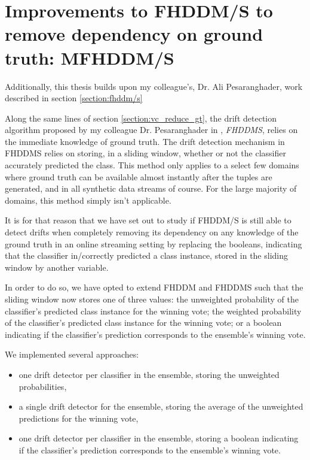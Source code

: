 \section{Improvements to FHDDM/S to remove dependency on ground truth: MFHDDM/S}

Additionally, this thesis builds upon my colleague's, Dr. Ali Pesaranghader, work described in section \ref{section:fhddm/s}

Along the same lines of section \ref{section:vc_reduce_gt}, the drift detection algorithm proposed by my colleague Dr. Pesaranghader in \cite{pesaranghader2016fast}, \textit{FHDDMS}, relies on the immediate knowledge of ground truth. The drift detection mechanism in FHDDMS relies on storing, in a sliding window, whether or not the classifier accurately predicted the class. This method only applies to a select few domains where ground truth can be available almost instantly after the tuples are generated, and in all synthetic data streams of course. For the large majority of domains, this method simply isn't applicable.

It is for that reason that we have set out to study if FHDDM/S is still able to detect drifts when completely removing its dependency on any knowledge of the ground truth in an online streaming setting by replacing the booleans, indicating that the classifier in/correctly predicted a class instance, stored in the sliding window by another variable.

In order to do so, we have opted to extend FHDDM and FHDDMS such that the sliding window now stores one of three values: the unweighted probability of the classifier's predicted class instance for the winning vote; the weighted probability of the classifier's predicted class instance for the winning vote; or a boolean indicating if the classifier's prediction corresponds to the ensemble's winning vote.

We implemented several approaches:
\begin{itemize}
\item one drift detector per classifier in the ensemble, storing the unweighted probabilities,
\item a single drift detector for the ensemble, storing the average of the unweighted predictions for the winning vote,
\item one drift detector per classifier in the ensemble, storing a boolean indicating if the classifier's prediction corresponds to the ensemble's winning vote.
\end{itemize}


